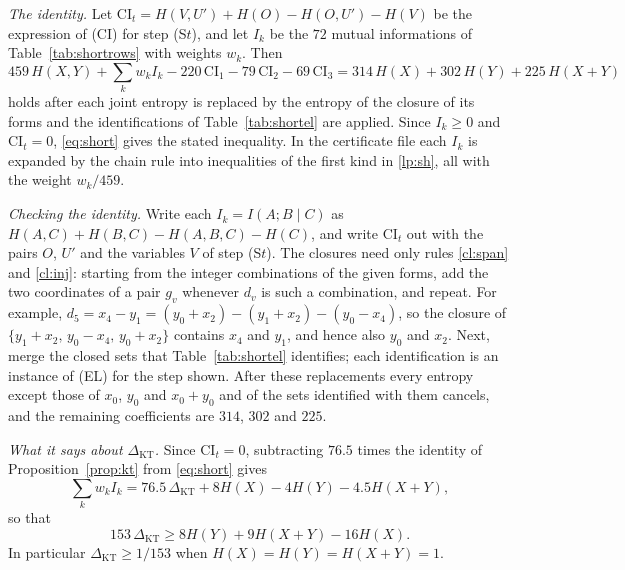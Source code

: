 \documentclass[11pt]{amsart}
\theoremstyle{definition}
\theoremstyle{remark}
\numberwithin{equation}{section}
\newcommand{\KT}{\mathrm{KT}}
\begin{document}
\emph{The identity.} Let $\mathrm{CI}_t=H(V,U')+H(O)-H(O,U')-H(V)$ be the expression of (CI) for step (S$t$), and let $I_k$ be the $72$ mutual informations of Table~\ref{tab:shortrows} with weights $w_k$. Then
\begin{equation}\label{eq:short}
459\,H(X,Y)+\sum_kw_kI_k-220\,\mathrm{CI}_1-79\,\mathrm{CI}_2-69\,\mathrm{CI}_3=314\,H(X)+302\,H(Y)+225\,H(X+Y)
\end{equation}
holds after each joint entropy is replaced by the entropy of the closure of its forms and the identifications of Table~\ref{tab:shortel} are applied. Since $I_k\ge0$ and $\mathrm{CI}_t=0$, \eqref{eq:short} gives the stated inequality. In the certificate file each $I_k$ is expanded by the chain rule into inequalities of the first kind in \ref{lp:sh}, all with the weight $w_k/459$.

\emph{Checking the identity.} Write each $I_k=I(A;B\mid C)$ as $H(A,C)+H(B,C)-H(A,B,C)-H(C)$, and write $\mathrm{CI}_t$ out with the pairs $O$, $U'$ and the variables $V$ of step (S$t$). The closures need only rules \ref{cl:span} and \ref{cl:inj}: starting from the integer combinations of the given forms, add the two coordinates of a pair $g_v$ whenever $d_v$ is such a combination, and repeat. For example, $d_5=x_4-y_1=(y_0+x_2)-(y_1+x_2)-(y_0-x_4)$, so the closure of $\{y_1+x_2,\,y_0-x_4,\,y_0+x_2\}$ contains $x_4$ and $y_1$, and hence also $y_0$ and $x_2$. Next, merge the closed sets that Table~\ref{tab:shortel} identifies; each identification is an instance of (EL) for the step shown. After these replacements every entropy except those of $x_0$, $y_0$ and $x_0+y_0$ and of the sets identified with them cancels, and the remaining coefficients are $314$, $302$ and $225$.

\emph{What it says about $\Delta_\KT$.} Since $\mathrm{CI}_t=0$, subtracting $76.5$ times the identity of Proposition~\ref{prop:kt} from \eqref{eq:short} gives
\[
\sum_kw_kI_k=76.5\,\Delta_\KT+8H(X)-4H(Y)-4.5H(X+Y),
\]
so that
\[
153\,\Delta_\KT\ge8H(Y)+9H(X+Y)-16H(X).
\]
In particular $\Delta_\KT\ge1/153$ when $H(X)=H(Y)=H(X+Y)=1$.
\end{document}
